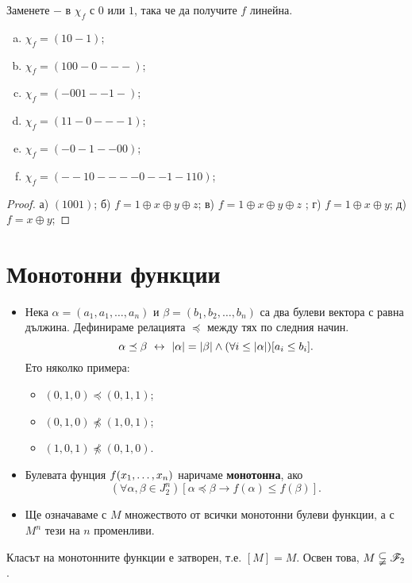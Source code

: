 \begin{problem}
  Заменете $-$ в $\chi_f$ с $0$ или $1$, така че да получите $f$ линейна.
  \begin{enumerate}[a)]
  \item
    $\chi_f = (10-1)$;
  \item
    $\chi_f = (100-0---)$;
  \item
    $\chi_f = (-001--1-)$;
  \item
    $\chi_f = (11-0---1)$;
  \item
    $\chi_f = (-0-1--00)$;
  \item
    $\chi_f = (--10----0--1-110)$;
  \end{enumerate}
\end{problem}
\begin{proof}
  а) $(1001)$; б) $f = 1\oplus x \oplus y\oplus z$; в) $f = 1\oplus x\oplus y\oplus z$ ;
  г) $f = 1\oplus x\oplus y$; д) $f = x\oplus y$;
\end{proof}


\section{Монотонни функции}

\begin{itemize}
\item 
  Нека $\alpha = (a_1,a_1,\dots,a_n)$ и $\beta = (b_1,b_2,\dots,b_n)$ са два булеви вектора с равна дължина.
  Дефинираме релацията $\preceq$ между тях по следния начин.
  \[\alpha \preceq \beta \ \leftrightarrow\  \lvert{\alpha}\rvert = \lvert{\beta}\rvert\wedge (\forall i \leq \lvert{\alpha}\rvert)[a_i \leq b_i].\]
  Ето няколко примера:
  \begin{itemize}
  \item 
    $(0,1,0) \preceq (0,1,1)$;
  \item
    $(0,1,0) \not\preceq (1,0,1)$;
  \item
    $(1,0,1) \not\preceq (0,1,0)$.
  \end{itemize}
\item
  Булевата фунция $f(x_{1},\dots,x_{n})$ наричаме {\bf монотонна}, ако 
  \[(\forall \alpha,\beta\in J^n_2 )[\alpha\preceq\beta \rightarrow f(\alpha) \leq f(\beta)].\]  
\item
  Ще означаваме с $M$ множеството от всички монотонни булеви функции, а с $M^n$ тези на $n$ променливи.
\end{itemize}

\begin{prop}
  Класът на монотонните функции е затворен, т.е. $[M] = M$.
  Освен това, $M \subsetneqq \mathscr{F}_2$.
\end{prop}

